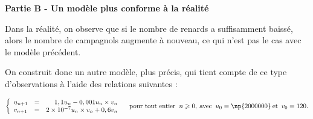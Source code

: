 \documentclass[10pt]{article}
\begin{document}
\bigskip

\textbf{Partie B - Un modèle plus conforme à la réalité}

\medskip

Dans la réalité, on observe que si le nombre de renards a suffisamment baissé, alors le nombre de
campagnols augmente à nouveau, ce qui n'est pas le cas avec le modèle précédent. 

On construit donc un autre modèle, plus précis, qui tient compte de ce type d'observations à l'aide des relations suivantes :

\[\left\{\begin{array}{l c r}
u_{n+1} &=& 1,1u_n - 0,001u_n \times v_n\\
v_{n+1} &=& 2 \times 10^{-7} u_n \times v_n + 0,6v_n
\end{array}\right.\quad \text{pour tout entier }\:n \geqslant 0,\: \text{avec }\:u_0 = \np{2000000}\: \text{et }\: v_0 = 120.\]

\medskip
\end{document}
